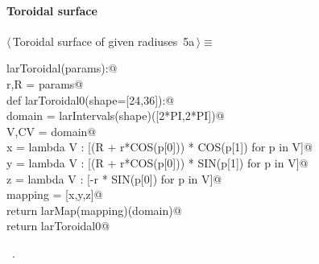 \documentclass[11pt,oneside]{article}	%
\begin{document}
\paragraph{Toroidal surface}
\begin{flushleft} \small \label{scrap10}
\protect{}$\langle\,$Toroidal surface of given radiuses\nobreak\ {\footnotesize 5a}$\,\rangle\equiv$
\vspace{-1ex}
\begin{list}{}{} \item
\mbox{}\verb@def larToroidal(params):@\\
\mbox{}\verb@   r,R = params@\\
\mbox{}\verb@   def larToroidal0(shape=[24,36]):@\\
\mbox{}\verb@      domain = larIntervals(shape)([2*PI,2*PI])@\\
\mbox{}\verb@      V,CV = domain@\\
\mbox{}\verb@      x = lambda V : [(R + r*COS(p[0])) * COS(p[1]) for p in V]@\\
\mbox{}\verb@      y = lambda V : [(R + r*COS(p[0])) * SIN(p[1]) for p in V]@\\
\mbox{}\verb@      z = lambda V : [-r * SIN(p[0]) for p in V]@\\
\mbox{}\verb@      mapping = [x,y,z]@\\
\mbox{}\verb@      return larMap(mapping)(domain)@\\
\mbox{}\verb@   return larToroidal0@\\
\mbox{}\verb@@{\NWsep}
\end{list}
\vspace{-1ex}
\footnotesize\addtolength{\baselineskip}{-1ex}
\begin{list}{}{\setlength{\itemsep}{-\parsep}\setlength{\itemindent}{-\leftmargin}}
\item \NWtxtMacroRefIn\ .
\end{list}
\end{flushleft}
\end{document}
